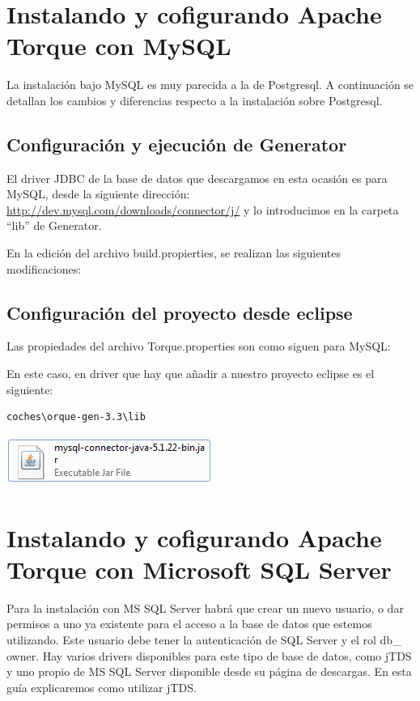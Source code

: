 \documentclass[12pt, oneside]{article}
\begin{document}
\section{Instalando y cofigurando Apache Torque con MySQL}
La instalación bajo MySQL es muy parecida a la de Postgresql. A continuación se detallan los cambios y diferencias respecto a la instalación sobre Postgresql.

\subsection{Configuración y ejecución de Generator}
El driver JDBC de la base de datos que descargamos en esta ocasión es para MySQL, desde la siguiente dirección: \url{http://dev.mysql.com/downloads/connector/j/} y lo introducimos en la carpeta “lib” de Generator.

En la edición del archivo build.propierties, se realizan las siguientes modificaciones:


\subsection{Configuración del proyecto desde eclipse}
Las propiedades del archivo Torque.properties son como siguen para MySQL:



En este caso, en driver que hay que añadir a nuestro proyecto eclipse es el siguiente:
\begin{lstlisting}
coches\orque-gen-3.3\lib
\end{lstlisting}

\begin{center}
	\includegraphics{img/mysql-file.png}
\end{center}

\section{Instalando y cofigurando Apache Torque con Microsoft SQL Server}
Para la instalación con MS SQL Server habrá que crear un nuevo usuario, o dar permisos a uno ya existente para el acceso a la base de datos que estemos utilizando. Este usuario debe tener la autenticación de SQL Server y el rol db\_ owner. Hay varios drivers disponibles para este tipo de base de datos, como jTDS y uno propio de MS SQL Server disponible desde su página de descargas. En esta guía explicaremos como utilizar jTDS.
\end{document}

